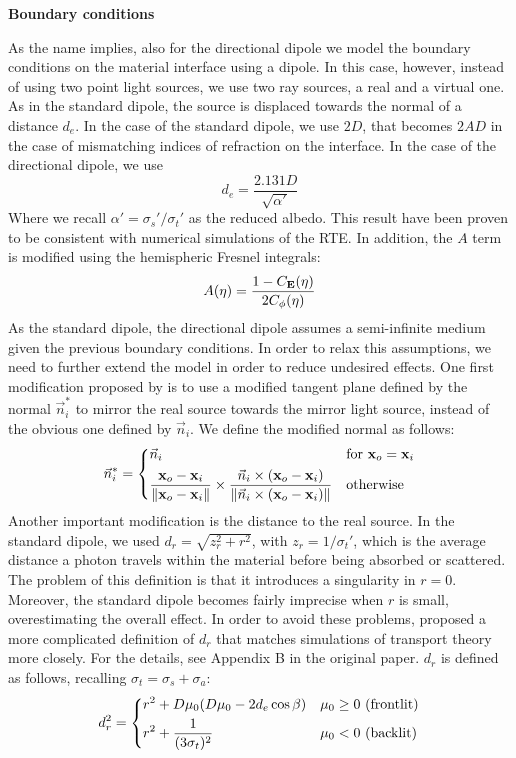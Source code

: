 \textbf{Boundary conditions}

As the name implies, also for the directional dipole we model the boundary conditions on the material interface using a dipole. In this case, however, instead of using two point light sources, we use two ray sources, a real and a virtual one. As in the standard dipole, the source is displaced towards the normal of a distance $d_e$. In the case of the standard dipole, we use $2D$, that becomes $2 A D$ in the case of mismatching indices of refraction on the interface. In the case of the directional dipole, we use 
$$
d_e = \frac{2.131 D}{\sqrt{\alpha'}}
$$ 
Where we recall $\alpha' = \sigma_s' / \sigma_t'$ as the reduced albedo. This result have been proven \citep{ntt} to be consistent with numerical simulations of the RTE. In addition, the $A$ term is modified using the hemispheric Fresnel integrals:
$$
A(\eta) = \frac{1 - C_{\mathbf{E}}(\eta)}{2 C_{\phi}(\eta)}
$$
As the standard dipole, the directional dipole assumes a semi-infinite medium given the previous boundary conditions. In order to relax this assumptions, we need to further extend the model in order to reduce undesired effects. One first modification proposed by \cite{IMM2013-06646} is to use a modified tangent plane defined by the normal $\vec{n}_i^*$ to mirror the real source towards the mirror light source, instead of the obvious one defined by $\vec{n}_i$. We define the modified normal as follows:
$$
\vec{n}_i^* = 
\begin{dcases} 
\vec{n}_i & \text{for}\ \mathbf{x}_o = \mathbf{x}_i \\
\frac{\mathbf{x}_o - \mathbf{x}_i}{\|\mathbf{x}_o - \mathbf{x}_i\|} \times \frac{\vec{n}_i \times (\mathbf{x}_o - \mathbf{x}_i)}{\|\vec{n}_i \times (\mathbf{x}_o - \mathbf{x}_i)\|} & \text{otherwise}
\end{dcases}
$$
Another important modification is the distance to the real source. In the standard dipole, we used $d_r = \sqrt{z_r^2 + r^2}$, with $z_r = 1 / \sigma_t'$, which is the average distance a photon travels within the material before being absorbed or scattered. The problem of this definition is that it introduces a singularity in $r = 0$. Moreover, the standard dipole becomes fairly imprecise when $r$ is small, overestimating the overall effect. In order to avoid these problems, \cite{IMM2013-06646} proposed a more complicated definition of $d_r$ that matches simulations of transport theory more closely. For the details, see Appendix B in the original paper. $d_r$ is defined as follows, recalling $\sigma_t = \sigma_s + \sigma_a$:
$$
d_r^2 = \begin{dcases}
r^2 + D \mu_0 (D \mu_0 - 2 d_e \cos \beta) & \mu_0 \geq 0 \  \text{(frontlit)}\\
r^2 + \frac{1}{(3 \sigma_t)^2} & \mu_0 < 0 \ \text{(backlit)}
\end{dcases}
$$
